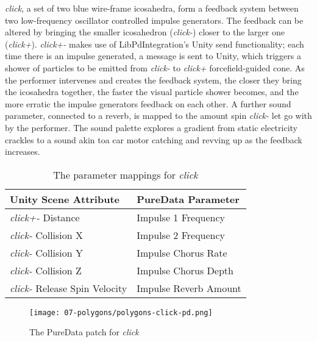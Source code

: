 \textit{click}, a set of two blue wire-frame icosahedra, form a feedback system between two low-frequency oscillator controlled impulse generators. The feedback can be altered by bringing the smaller icosahedron (\textit{click-}) closer to the larger one (\textit{click+}). \textit{click+-} makes use of LibPdIntegration's Unity send functionality; each time there is an impulse generated, a message is sent to Unity, which triggers a shower of particles to be emitted from \textit{click-} to \textit{click+} forcefield-guided cone. As the performer intervenes and creates the feedback system, the closer they bring the icosahedra together, the faster the visual particle shower becomes, and the more erratic the impulse generators feedback on each other. A further sound parameter, connected to a reverb, is mapped to the amount spin \textit{click-} let go with by the performer. The sound palette explores a gradient from static electricity crackles to a sound akin toa car motor catching and revving up as the feedback increases.
\begin{table}
    \centering
    \begin{tabular}{ l|l }
        \textbf{Unity Scene Attribute}         & \textbf{PureData Parameter}   \\
        \hline      
        \textit{click+-} Distance              & Impulse 1 Frequency           \\
        \textit{click-} Collision X            & Impulse 2 Frequency           \\
        \textit{click-} Collision Y            & Impulse Chorus Rate           \\
        \textit{click-} Collision Z            & Impulse Chorus Depth          \\
        \textit{click-} Release Spin Velocity  & Impulse Reverb Amount     
    \end{tabular}
    \caption{The parameter mappings for \textit{click}}
    \label{fig: polygons-click-mapping}
\end{table}
\begin{figure}
    \centering
    \texttt{[image: 07-polygons/polygons-click-pd.png]}
    \caption{The PureData patch for \textit{click}}
    \label{fig: polygons-click-pd}
\end{figure}

